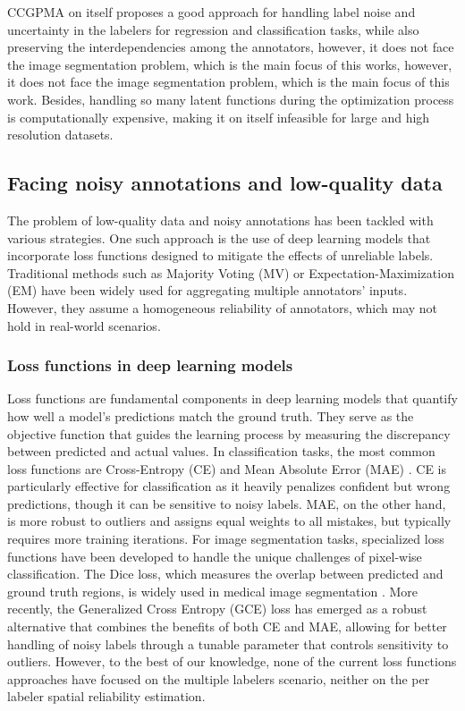 \gls{CCGPMA} on itself proposes a good approach for handling label
noise and uncertainty in the labelers for regression and
classification tasks, while also preserving the interdependencies
among the annotators, however, it does not face the image segmentation
problem, which is the main focus of this works, however, it does not
face the image segmentation problem, which is the main focus of this
work. Besides, handling so many latent functions during the
optimization process is computationally expensive, making it on itself
infeasible for large and high resolution datasets.

\subsection{Facing noisy annotations and low-quality data}

The problem of low-quality data and noisy annotations has been
tackled with various strategies. One such approach is the use of deep
learning models that incorporate loss functions designed to mitigate
the effects of unreliable labels. Traditional methods such as
Majority Voting (MV) or Expectation-Maximization (EM) have been
widely used for aggregating multiple annotators' inputs. However,
they assume a homogeneous reliability of annotators, which may not
hold in real-world scenarios.

\subsubsection{Loss functions in deep learning models}

Loss functions are fundamental components in deep learning models
that quantify how well a model's predictions match the ground truth.
They serve as the objective function that guides the learning process
by measuring the discrepancy between predicted and actual values. In
classification tasks, the most common loss functions are
Cross-Entropy (CE) and Mean Absolute Error (MAE)
\cite{ZhangEtAl2018}. CE is particularly
effective for classification as it heavily penalizes confident but
wrong predictions, though it can be sensitive to noisy labels. MAE,
on the other hand, is more robust to outliers and assigns equal
weights to all mistakes, but typically requires more training
iterations. For image segmentation tasks, specialized loss functions
have been developed to handle the unique challenges of pixel-wise
classification. The Dice loss, which measures the overlap between
predicted and ground truth regions, is widely used in medical image
segmentation \cite{ZhaoEtAl2020}. More recently, the Generalized
Cross Entropy (GCE) loss has emerged as a robust alternative that
combines the benefits of both CE and MAE, allowing for better
handling of noisy labels through a tunable parameter that controls
sensitivity to outliers. However, to the best of our knowledge, none
of the current loss functions approaches have focused on the multiple
labelers scenario, neither on the per labeler spatial reliability
estimation.

